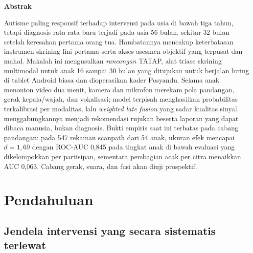 \documentclass[10pt,letterpaper]{article}
\newcommand{\produk}{TATAP}
\begin{document}
\begin{center}
\begin{minipage}{\dimexpr\textwidth-1in\relax}
{\centering\large\bfseries Abstrak\par}
\vspace{0.4em}
\small
Autisme paling responsif terhadap intervensi pada usia di bawah tiga tahun, tetapi diagnosis
rata-rata baru terjadi pada usia 56 bulan, sekitar 32 bulan setelah keresahan pertama orang
tua. Hambatannya mencakup keterbatasan instrumen skrining lini pertama serta akses asesmen
objektif yang terpusat dan mahal. Makalah ini mengusulkan \emph{rancangan} \produk, alat
triase skrining multimodal untuk anak 16 sampai 30 bulan yang ditujukan untuk berjalan luring
di tablet Android biasa dan dioperasikan kader Posyandu. Selama anak menonton video dua menit,
kamera dan mikrofon merekam pola pandangan, gerak kepala/wajah, dan vokalisasi; model terpisah
menghasilkan probabilitas terkalibrasi per modalitas, lalu \textit{weighted late fusion} yang
sadar kualitas sinyal menggabungkannya menjadi rekomendasi rujukan beserta laporan yang dapat
dibaca manusia, bukan diagnosis. Bukti empiris saat ini terbatas pada cabang pandangan: pada
547 rekaman scanpath dari 54 anak, ukuran efek mencapai $d = 1{,}69$ dengan ROC-AUC 0,845
pada tingkat anak di bawah evaluasi yang dikelompokkan per partisipan, sementara pembagian
acak per citra menaikkan AUC 0,063. Cabang gerak, suara, dan fusi akan diuji prospektif.
\end{minipage}
\end{center}
\vspace{0.5em}

\section{Pendahuluan}

\subsection{Jendela intervensi yang secara sistematis terlewat}
\end{document}
